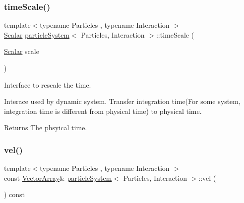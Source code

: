 \mbox{\label{classparticle_system_a803227b33f7c25f28fb0575cf798d1a8}} 
\subsubsection{\texorpdfstring{time\+Scale()}{timeScale()}}
{\footnotesize\ttfamily template$<$typename Particles , typename Interaction $>$ \\
\mbox{\hyperlink{classparticle_system_a3938954186247e3eab01cc75fcc62b40}{Scalar}} \mbox{\hyperlink{classparticle_system}{particle\+System}}$<$ Particles, Interaction $>$\+::time\+Scale (\begin{DoxyParamCaption}\item[{\mbox{\hyperlink{classparticle_system_a3938954186247e3eab01cc75fcc62b40}{Scalar}}}]{scale }\end{DoxyParamCaption})\hspace{0.3cm}{\ttfamily [inline]}}



Interface to rescale the time. 

Interace used by dynamic system. Transfer integration time(For some system, integration time is different from physical time) to physical time. \begin{DoxyReturn}{Returns}
The phsyical time. 
\end{DoxyReturn}
\mbox{\label{classparticle_system_a4609f37fb9055bc71f14dbf6738017ba}} 
\subsubsection{\texorpdfstring{vel()}{vel()}\hspace{0.1cm}{\footnotesize\ttfamily [1/2]}}
{\footnotesize\ttfamily template$<$typename Particles , typename Interaction $>$ \\
const \mbox{\hyperlink{classparticle_system_ac8049667a0d05e76b836642503a71c12}{Vector\+Array}}\& \mbox{\hyperlink{classparticle_system}{particle\+System}}$<$ Particles, Interaction $>$\+::vel (\begin{DoxyParamCaption}{ }\end{DoxyParamCaption}) const\hspace{0.3cm}{\ttfamily [inline]}}



